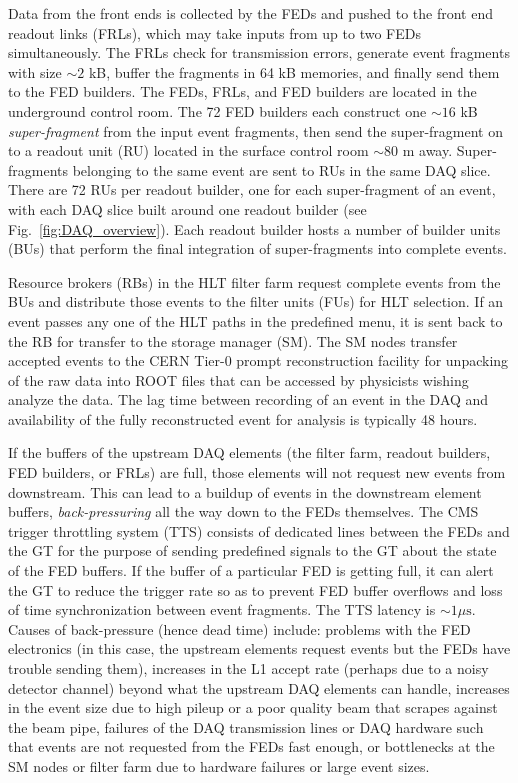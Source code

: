\documentclass[dissertation.tex]{subfiles}
\begin{document}
Data from the front ends is collected by the FEDs and pushed to the front end readout links (FRLs), which may take inputs from up to two FEDs simultaneously.  The FRLs check for transmission errors, generate event fragments with size $\sim2$ kB, buffer the fragments in 64 kB memories, and finally send them to the FED builders.  The FEDs, FRLs, and FED builders are located in the underground control room.  The 72 FED builders each construct one $\sim16$ kB \textit{super-fragment} from the input event fragments, then send the super-fragment on to a readout unit (RU) located in the surface control room $\sim80$ m away.  Super-fragments belonging to the same event are sent to RUs in the same DAQ slice.  There are 72 RUs per readout builder, one for each super-fragment of an event, with each DAQ slice built around one readout builder (see Fig.~\ref{fig:DAQ_overview}).  Each readout builder hosts a number of builder units (BUs) that perform the final integration of super-fragments into complete events.

Resource brokers (RBs) in the HLT filter farm request complete events from the BUs and distribute those events to the filter units (FUs) for HLT selection.  If an event passes any one of the HLT paths in the predefined menu, it is sent back to the RB for transfer to the storage manager (SM).  The SM nodes transfer accepted events to the CERN Tier-0 prompt reconstruction facility for unpacking of the raw data into ROOT \cite{Brun199781} files that can be accessed by physicists wishing analyze the data.  The lag time between recording of an event in the DAQ and availability of the fully reconstructed event for analysis is typically 48 hours.

If the buffers of the upstream DAQ elements (the filter farm, readout builders, FED builders, or FRLs) are full, those elements will not request new events from downstream.  This can lead to a buildup of events in the downstream element buffers, \textit{back-pressuring} all the way down to the FEDs themselves.  The CMS trigger throttling system (TTS) consists of dedicated lines between the FEDs and the GT for the purpose of sending predefined signals to the GT about the state of the FED buffers.  If the buffer of a particular FED is getting full, it can alert the GT to reduce the trigger rate so as to prevent FED buffer overflows and loss of time synchronization between event fragments.  The TTS latency is $\sim1 \mu\mbox{s}$.  Causes of back-pressure (hence dead time) include: problems with the FED electronics (in this case, the upstream elements request events but the FEDs have trouble sending them), increases in the L1 accept rate (perhaps due to a noisy detector channel) beyond what the upstream DAQ elements can handle, increases in the event size due to high pileup or a poor quality beam that scrapes against the beam pipe, failures of the DAQ transmission lines or DAQ hardware such that events are not requested from the FEDs fast enough, or bottlenecks at the SM nodes or filter farm due to hardware failures or large event sizes.
\end{document}
